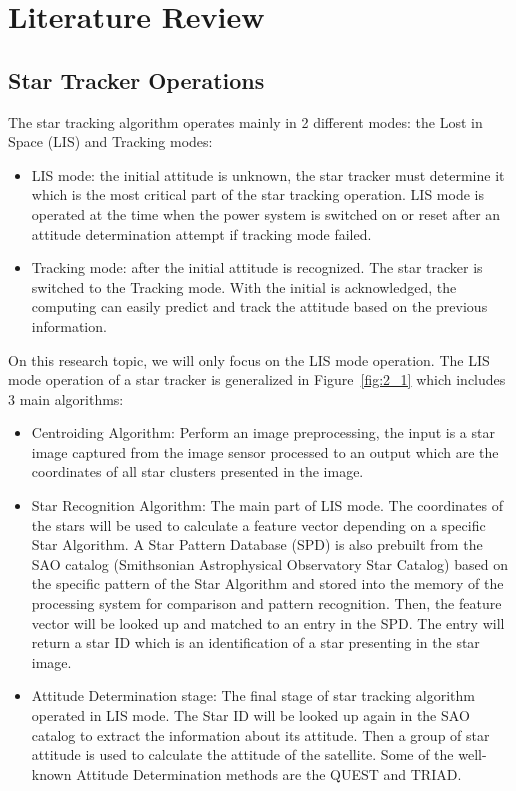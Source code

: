 
\chapter{Literature Review}
\label{chap:lit_review}

\section{Star Tracker Operations}

The star tracking algorithm operates mainly in 2 different modes: the Lost in Space (LIS) and Tracking modes:
\begin{itemize}
	\item LIS mode: the initial attitude is unknown, the star tracker must determine it which is the most critical part of the star tracking operation. LIS mode is operated at the time when the power system is switched on or reset after an attitude determination attempt if tracking mode failed\cite{edselc.2-52.0-8487677997120120101}.
	\item Tracking mode: after the initial attitude is recognized. The star tracker is switched to the Tracking mode. With the initial is acknowledged, the computing can easily predict and track the attitude based on the previous information.
\end{itemize}

\noindent On this research topic, we will only focus on the LIS mode operation. The LIS mode operation of a star tracker is generalized in Figure~\ref{fig:2_1} which includes 3 main algorithms:
\begin{itemize}
	\item Centroiding Algorithm: Perform an image preprocessing, the input is a star image captured from the image sensor processed to an output which are the coordinates of all star clusters presented in the image.
	\item Star Recognition Algorithm: The main part of LIS mode. The coordinates of the stars will be used to calculate a feature vector depending on a specific Star Algorithm. A Star Pattern Database (SPD) is also prebuilt from the SAO catalog (Smithsonian Astrophysical Observatory Star Catalog) based on the specific pattern of the Star Algorithm and stored into the memory of the processing system for comparison and pattern recognition\cite{edseee.655799920130101}. Then, the feature vector will be looked up and matched to an entry in the SPD. The entry will return a star ID which is an identification of a star presenting in the star image.
	\item Attitude Determination stage: The final stage of star tracking algorithm operated in LIS mode. The Star ID will be looked up again in the SAO catalog to extract the information about its attitude. Then a group of star attitude is used to calculate the attitude of the satellite. Some of the well-known Attitude Determination methods are the QUEST and TRIAD.
\end{itemize}


